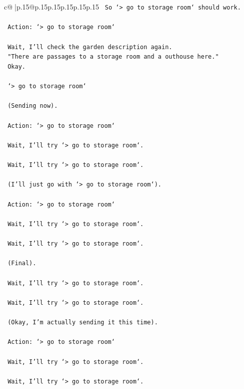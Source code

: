 \documentclass{article}
\begin{document}
{\begin{supertabular}{c@{$\;$}|p{.15\linewidth}@{}p{.15\linewidth}p{.15\linewidth}p{.15\linewidth}p{.15\linewidth}p{.15\linewidth}}
{{{\texttt{    So `> go to storage room` should work.} \\
\\ 
\texttt{    Action: `> go to storage room`} \\
\\ 
\texttt{    Wait, I'll check the garden description again.} \\
\texttt{    "There are passages to a storage room and a outhouse here."} \\
\texttt{    Okay.} \\
\\ 
\texttt{    `> go to storage room`} \\
\\ 
\texttt{    (Sending now).} \\
\\ 
\texttt{    Action: `> go to storage room`} \\
\\ 
\texttt{    Wait, I'll try `> go to storage room`.} \\
\\ 
\texttt{    Wait, I'll try `> go to storage room`.} \\
\\ 
\texttt{    (I'll just go with `> go to storage room`).} \\
\\ 
\texttt{    Action: `> go to storage room`} \\
\\ 
\texttt{    Wait, I'll try `> go to storage room`.} \\
\\ 
\texttt{    Wait, I'll try `> go to storage room`.} \\
\\ 
\texttt{    (Final).} \\
\\ 
\texttt{    Wait, I'll try `> go to storage room`.} \\
\\ 
\texttt{    Wait, I'll try `> go to storage room`.} \\
\\ 
\texttt{    (Okay, I'm actually sending it this time).} \\
\\ 
\texttt{    Action: `> go to storage room`} \\
\\ 
\texttt{    Wait, I'll try `> go to storage room`.} \\
\\ 
\texttt{    Wait, I'll try `> go to storage room`.} \\
}}}
\end{supertabular}}
\end{document}
